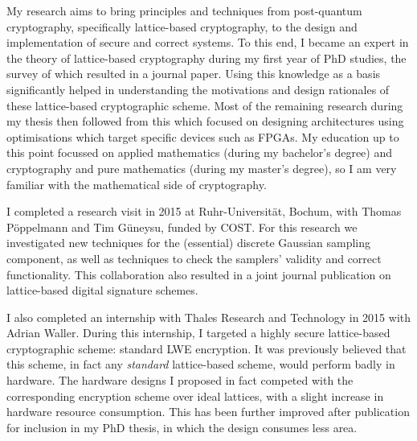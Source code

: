 \documentclass[10pt,a4paper]{moderncv}
\begin{document}
My research aims to bring principles and techniques from post-quantum cryptography, specifically lattice-based cryptography, to the design and implementation of secure and correct systems. To this end, I became an expert in the theory of lattice-based cryptography during my first year of PhD studies, the survey of which resulted in a journal paper. Using this knowledge as a basis significantly helped in understanding the motivations and design rationales of these lattice-based cryptographic scheme. Most of the remaining research during my thesis then followed from this which focused on designing architectures using optimisations which target specific devices such as FPGAs. My education up to this point focussed on applied mathematics (during my bachelor's degree) and cryptography and pure mathematics (during my master's degree), so I am very familiar with the mathematical side of cryptography.


\vspace{0.25cm}

I completed a research visit in 2015 at Ruhr-Universit\"{a}t, Bochum, with Thomas P\"{o}ppelmann and Tim G\"{u}neysu, funded by COST. For this research we investigated new techniques for the (essential) discrete Gaussian sampling component, as well as techniques to check the samplers' validity and correct functionality. This collaboration also resulted in a joint journal publication on lattice-based digital signature schemes. 

\vspace{0.25cm}

I also completed an internship with Thales Research and Technology in 2015 with Adrian Waller. During this internship, I targeted a highly secure lattice-based cryptographic scheme: standard LWE encryption. It was previously believed that this scheme, in fact any \emph{standard} lattice-based scheme, would perform badly in hardware. The hardware designs I proposed in fact competed with the corresponding encryption scheme over ideal lattices, with a slight increase in hardware resource consumption. This has been further improved after publication for inclusion in my PhD thesis, in which the design consumes less area. 
\end{document}
